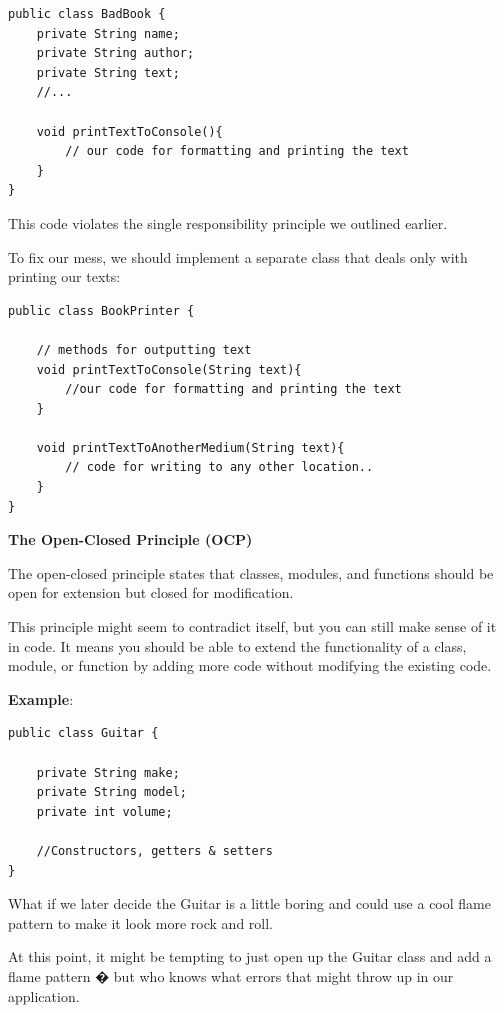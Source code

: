 \begin{lstlisting}
public class BadBook {
    private String name;
    private String author;
    private String text;
    //...

    void printTextToConsole(){
        // our code for formatting and printing the text
    }
}
\end{lstlisting}

This code violates the single responsibility principle we outlined earlier.

To fix our mess, we should implement a separate class that deals only with printing our texts:

\begin{lstlisting}
public class BookPrinter {

    // methods for outputting text
    void printTextToConsole(String text){
        //our code for formatting and printing the text
    }

    void printTextToAnotherMedium(String text){
        // code for writing to any other location..
    }
}
\end{lstlisting}

\medskip
\begin{center}
\textbf{The Open-Closed Principle (OCP)}
\end{center}

The open-closed principle states that classes, modules, and functions should be open for extension but closed for modification.

This principle might seem to contradict itself, but you can still make sense of it in code. It means you should be able to extend the functionality of a class, module, or function by adding more code without modifying the existing code.

\textbf{Example}:

\begin{lstlisting}
public class Guitar {

    private String make;
    private String model;
    private int volume;

    //Constructors, getters & setters
}
\end{lstlisting}

What if we later decide the Guitar is a little boring and could use a cool flame pattern to make it look more rock and roll.

At this point, it might be tempting to just open up the Guitar class and add a flame pattern � but who knows what errors that might throw up in our application.

